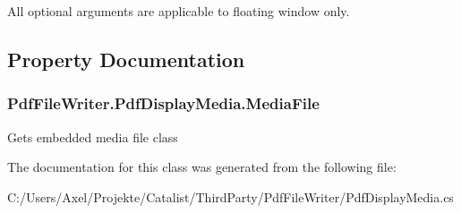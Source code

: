 All optional arguments are applicable to floating window only. 

\subsection{Property Documentation}
\subsubsection[{\texorpdfstring{Media\+File}{MediaFile}}]{ Pdf\+File\+Writer.\+Pdf\+Display\+Media.\+Media\+File\hspace{0.3cm}{\ttfamily [get]}}\hypertarget{class_pdf_file_writer_1_1_pdf_display_media_add8c8947af649debff781cbc6625eb7c}{}\label{class_pdf_file_writer_1_1_pdf_display_media_add8c8947af649debff781cbc6625eb7c}


Gets embedded media file class 



The documentation for this class was generated from the following file\+:\begin{DoxyCompactItemize}
\item 
C\+:/\+Users/\+Axel/\+Projekte/\+Catalist/\+Third\+Party/\+Pdf\+File\+Writer/Pdf\+Display\+Media.\+cs\end{DoxyCompactItemize}
